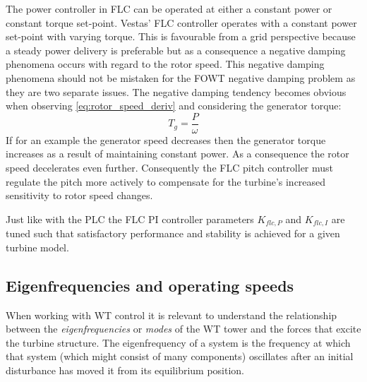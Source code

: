The power controller in FLC can be operated at either a constant power or constant torque set-point. Vestas' FLC controller operates with a constant power set-point with varying torque. This is favourable from a grid perspective because a steady power delivery is preferable but as a consequence a negative damping phenomena occurs with regard to the rotor speed. This negative damping phenomena should not be mistaken for the FOWT negative damping problem as they are two separate issues. The negative damping tendency becomes obvious when observing \cref{eq:rotor_speed_deriv} and considering the generator torque:
\begin{equation}\label{eq:gen_torque}
	T_g = \dfrac{P}{\omega}
\end{equation}
If for an example the generator speed decreases then the generator torque increases as a result of maintaining constant power. As a consequence the rotor speed decelerates even further. Consequently the FLC pitch controller must regulate the pitch more actively to compensate for the turbine's increased sensitivity to rotor speed changes.

Just like with the PLC the FLC PI controller parameters $ K_{flc,P} $ and $ K_{flc,I} $ are tuned such that satisfactory performance and stability is achieved for a given turbine model. 


\subsection{Eigenfrequencies and operating speeds} \label{sec:theory_eigenfreq}
When working with WT control it is relevant to understand the relationship between the \textit{eigenfrequencies} or \textit{modes} of the WT tower and the forces that excite the turbine structure. The eigenfrequency of a system is the frequency at which that system (which might consist of many components) oscillates after an initial disturbance has moved it from its equilibrium position. 

